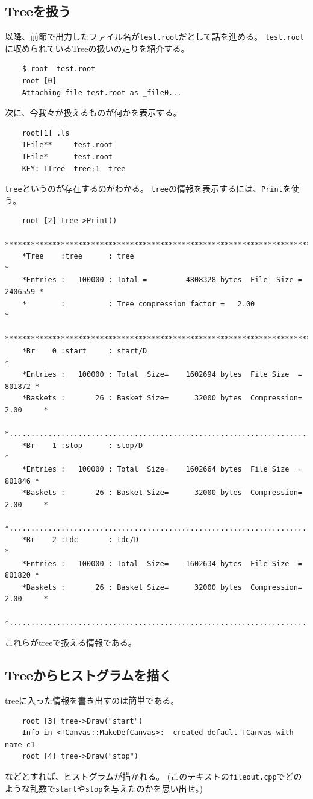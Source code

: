 \documentclass{jarticle}
\begin{document}
  \subsection{Treeを扱う}
  以降、前節で出力したファイル名が\verb|test.root|だとして話を進める。
  \verb|test.root|に収められているTreeの扱いの走りを紹介する。
\begin{verbatim}
	$ root  test.root 
	root [0] 
	Attaching file test.root as _file0...
\end{verbatim}
次に、今我々が扱えるものが何かを表示する。
\begin{verbatim}
	root[1] .ls
	TFile**		test.root
	TFile*		test.root
	KEY: TTree	tree;1	tree
\end{verbatim}
\verb|tree|というのが存在するのがわかる。
\verb|tree|の情報を表示するには、\verb|Print|を使う。
\begin{verbatim}
	root [2] tree->Print()
	******************************************************************************
	*Tree    :tree      : tree                                                   *
	*Entries :   100000 : Total =         4808328 bytes  File  Size =    2406559 *
	*        :          : Tree compression factor =   2.00                       *
	******************************************************************************
	*Br    0 :start     : start/D                                                *
	*Entries :   100000 : Total  Size=    1602694 bytes  File Size  =     801872 *
	*Baskets :       26 : Basket Size=      32000 bytes  Compression=   2.00     *
	*............................................................................*
	*Br    1 :stop      : stop/D                                                 *
	*Entries :   100000 : Total  Size=    1602664 bytes  File Size  =     801846 *
	*Baskets :       26 : Basket Size=      32000 bytes  Compression=   2.00     *
	*............................................................................*
	*Br    2 :tdc       : tdc/D                                                  *
	*Entries :   100000 : Total  Size=    1602634 bytes  File Size  =     801820 *
	*Baskets :       26 : Basket Size=      32000 bytes  Compression=   2.00     *
	*............................................................................*
\end{verbatim}
これらがtreeで扱える情報である。

  \subsection{Treeからヒストグラムを描く}
  treeに入った情報を書き出すのは簡単である。
\begin{verbatim}
	root [3] tree->Draw("start")
	Info in <TCanvas::MakeDefCanvas>:  created default TCanvas with name c1
	root [4] tree->Draw("stop")
\end{verbatim}
などとすれば、ヒストグラムが描かれる。
(このテキストの\verb|fileout.cpp|でどのような乱数で\verb|start|や\verb|stop|を与えたのかを思い出せ。)
\end{document}
